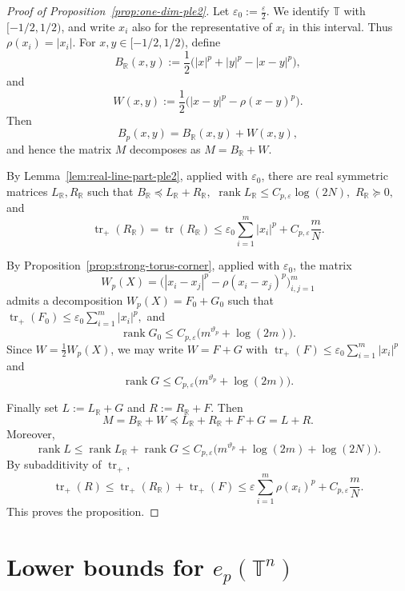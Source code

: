 \documentclass[11pt]{article}
\theoremstyle{definition}
\newcommand{\T}{\mathbb T}
\newcommand{\R}{\mathbb R}
\begin{document}
\begin{proof}[Proof of Proposition~\ref{prop:one-dim-ple2}]
Let
\(
\varepsilon_0:=\frac{\varepsilon}{2}.
\)
We identify \(\T\) with \([-1/2,1/2)\), and write \(x_i\) also for the
representative of \(x_i\) in this interval. Thus
\(
\rho(x_i)=|x_i|.
\)
For \(x,y\in[-1/2,1/2)\), define
\[
B_{\R}(x,y):=
\frac12\bigl(|x|^p+|y|^p-|x-y|^p\bigr),
\]
and
\[
W(x,y):=
\frac12\bigl(|x-y|^p-\rho(x-y)^p\bigr).
\]
Then
\[
B_p(x,y)=B_{\R}(x,y)+W(x,y),
\]
and hence the matrix \(M\) decomposes as
\(
M=B_{\R}+W.
\)

By Lemma~\ref{lem:real-line-part-ple2}, applied with \(\varepsilon_0\), there are
real symmetric matrices \(L_{\R},R_{\R}\) such that
\(
B_{\R}\preceq L_{\R}+R_{\R},
\)
\(
\operatorname{rank}L_{\R}\le C_{p,\varepsilon}\log(2N),
\)
\(
R_{\R}\succeq0,
\)
and
\[
\operatorname{tr}_+(R_{\R})
=
\operatorname{tr}(R_{\R})
\le
\varepsilon_0\sum_{i=1}^m |x_i|^p
+
C_{p,\varepsilon}\frac{m}{N}.
\]

By Proposition~\ref{prop:strong-torus-corner}, applied with \(\varepsilon_0\), the
matrix
\[
W_p(X)=\bigl(|x_i-x_j|^p-\rho(x_i-x_j)^p\bigr)_{i,j=1}^m
\]
admits a decomposition
\(
W_p(X)=F_0+G_0
\)
such that
\(
\operatorname{tr}_+(F_0)
\le
\varepsilon_0\sum_{i=1}^m |x_i|^p,
\)
and
\[
\operatorname{rank}G_0
\le
C_{p,\varepsilon}\bigl(m^{\vartheta_p}+\log(2m)\bigr).
\]
Since \(W=\frac12 W_p(X)\), we may write
\(
W=F+G
\)
with
\(
\operatorname{tr}_+(F)
\le
\varepsilon_0\sum_{i=1}^m |x_i|^p
\)
and
\[
\operatorname{rank}G
\le
C_{p,\varepsilon}\bigl(m^{\vartheta_p}+\log(2m)\bigr).
\]

Finally set
\(
L:=L_{\R}+G\) and
\(
R:=R_{\R}+F.
\)
Then
\[
M=B_{\R}+W
\preceq
L_{\R}+R_{\R}+F+G
=
L+R.
\]
Moreover,
\[
\operatorname{rank}L
\le
\operatorname{rank}L_{\R}+\operatorname{rank}G
\le
C_{p,\varepsilon}\bigl(m^{\vartheta_p}+\log(2m)+\log(2N)\bigr).
\]
By subadditivity of \(\operatorname{tr}_+\),
\[
\operatorname{tr}_+(R)
\le
\operatorname{tr}_+(R_{\R})+\operatorname{tr}_+(F)
\le
\varepsilon\sum_{i=1}^m \rho(x_i)^p
+
C_{p,\varepsilon}\frac{m}{N}.
\]
This proves the proposition.
\end{proof}











\section{Lower bounds for \(e_{p}(\mathbb{T}^{n})\)}
\end{document}
